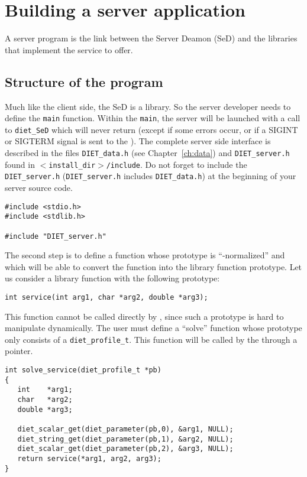 

\chapter{Building a server application}
\label{ch:server}

A \diet server program is the link between the \diet Server Deamon
(SeD) and the libraries that implement the service to offer.

\section{Structure of the program}
\label{sec:sv_struct}

Much like the client side, the \diet SeD is a library. So the server developer
needs to define the \texttt{main} function. Within the \texttt{main}, the \diet
server will be launched with a call to \texttt{diet\_SeD} which will never
return (except if some errors occur, or if a SIGINT or SIGTERM signal is sent
to the \sed). The complete server side interface is described in the files
\texttt{DIET\_data.h} (see Chapter~\ref{ch:data}) and \texttt{DIET\_server.h}
found in \texttt{$<$install\_dir$>$/include}. Do not forget to include the
\texttt{DIET\_server.h} (\texttt{DIET\_server.h} includes
\texttt{DIET\_data.h}) at the beginning of your server source code.

{\footnotesize
\begin{verbatim}
#include <stdio.h>
#include <stdlib.h>

#include "DIET_server.h"
\end{verbatim}
}

The second step is to define a function whose prototype is ``\diet-normalized''
and which will be able to convert the function into the library function prototype.
Let us consider a library function with the following prototype:
{\footnotesize
\begin{verbatim}
int service(int arg1, char *arg2, double *arg3);
\end{verbatim}
}

This function cannot be called directly by \diet, since such a prototype is hard
to manipulate dynamically. The user must define a ``solve'' function whose
prototype only consists of a \texttt{diet\_profile\_t}.
This function will be called by the \diet \sed through a pointer.
{\footnotesize
\begin{verbatim}
int solve_service(diet_profile_t *pb)
{
   int    *arg1;
   char   *arg2;
   double *arg3;

   diet_scalar_get(diet_parameter(pb,0), &arg1, NULL);
   diet_string_get(diet_parameter(pb,1), &arg2, NULL);
   diet_scalar_get(diet_parameter(pb,2), &arg3, NULL);
   return service(*arg1, arg2, arg3);
}
\end{verbatim}
}

